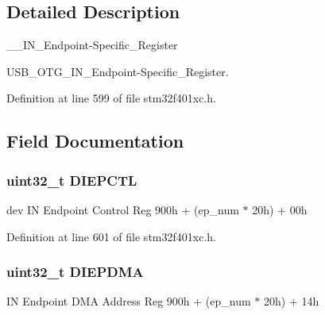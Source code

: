 \subsection{Detailed Description}
\+\_\+\+\_\+\+I\+N\+\_\+\+Endpoint-\/\+Specific\+\_\+\+Register 

U\+S\+B\+\_\+\+O\+T\+G\+\_\+\+I\+N\+\_\+\+Endpoint-\/\+Specific\+\_\+\+Register. 

Definition at line 599 of file stm32f401xc.\+h.



\subsection{Field Documentation}
\subsubsection[{\texorpdfstring{D\+I\+E\+P\+C\+TL}{DIEPCTL}}]{ uint32\+\_\+t D\+I\+E\+P\+C\+TL}\hypertarget{struct_u_s_b___o_t_g___i_n_endpoint_type_def_a840b32fa57faa544c3000ae1d08564c7}{}\label{struct_u_s_b___o_t_g___i_n_endpoint_type_def_a840b32fa57faa544c3000ae1d08564c7}
dev IN Endpoint Control Reg 900h + (ep\+\_\+num $\ast$ 20h) + 00h 

Definition at line 601 of file stm32f401xc.\+h.

\subsubsection[{\texorpdfstring{D\+I\+E\+P\+D\+MA}{DIEPDMA}}]{ uint32\+\_\+t D\+I\+E\+P\+D\+MA}\hypertarget{struct_u_s_b___o_t_g___i_n_endpoint_type_def_a05fcc63652e936e715223e4423069959}{}\label{struct_u_s_b___o_t_g___i_n_endpoint_type_def_a05fcc63652e936e715223e4423069959}
IN Endpoint D\+MA Address Reg 900h + (ep\+\_\+num $\ast$ 20h) + 14h 

